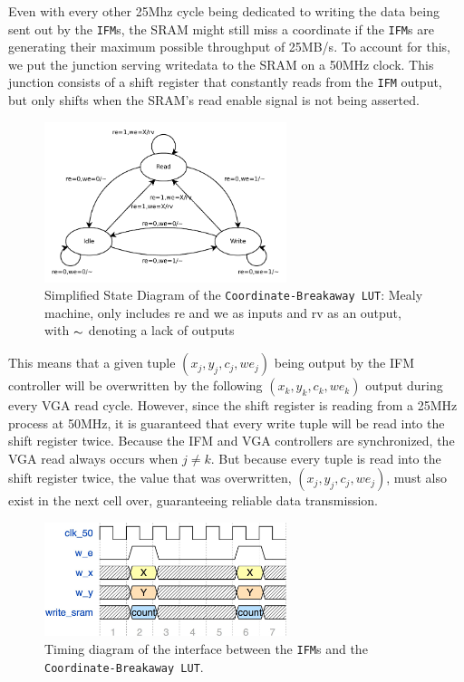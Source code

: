 \documentclass{article}
\begin{document}
Even with every other 25Mhz cycle being dedicated to writing the data being sent out by the \texttt{IFM}s, the SRAM might
still miss a coordinate if the \texttt{IFM}s are generating their maximum possible throughput of 25MB/s. To account for this, 
we put the junction serving writedata to the SRAM on a 50MHz clock. This junction consists of a shift register that 
constantly reads from the \texttt{IFM} output, but only shifts when the SRAM's read enable signal is not being asserted. 

\begin{figure}[H]
  \centering
    \includegraphics[width=200pt]{state_diagrams/clut.pdf}
  \caption{Simplified State Diagram of the \texttt{Coordinate-Breakaway LUT}:
    Mealy machine, only includes re and we as inputs and rv as an
    output, with $\thicksim$ denoting a lack of outputs}
\end{figure}

This means that a given tuple $(x_j, y_j, c_j, we_j)$ being output by the IFM controller will be overwritten by the 
following $(x_k, y_k, c_k, we_k)$ output during every VGA read cycle. However, since the shift register is reading from a 25MHz process at 50MHz, it is guaranteed that every write tuple will be read into the shift register twice. Because the IFM
and VGA controllers are synchronized, the VGA read always occurs when $j \neq k$. But because every tuple is read into the
shift register twice, the value that was overwritten, $(x_j, y_j, c_j, we_j)$, must also exist in the next cell over, 
guaranteeing reliable data transmission.

\begin{figure}[H]
  \centering
    \includegraphics[width=200pt]{timing_diagrams/ifm_clut.pdf}
  \caption{Timing diagram of the interface between the \texttt{IFM}s and the \texttt{Coordinate-Breakaway LUT}.}
\end{figure}
\end{document}
